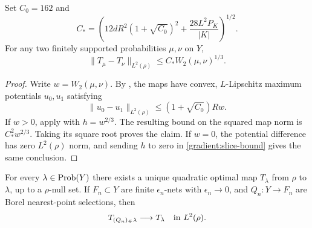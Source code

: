 \begin{corollary}\label{gradient:finite}
Set $C_0=162$ and
\begin{equation}\label{gradient:constant}
 C_*=
 \left(12dR^2(1+\sqrt{C_0})^2
             +\frac{28L^2P_K}{|K|}\right)^{1/2}.
\end{equation}
For any two finitely supported probabilities $\mu,\nu$ on $Y$,
\[
 \|T_\mu-T_\nu\|_{L^2(\rho)}
 \le C_*W_2(\mu,\nu)^{1/3}.
\]
\end{corollary}

\begin{proof}
Write $w=W_2(\mu,\nu)$.  By , the maps have
convex, $L$-Lipschitz maximum potentials $u_0,u_1$ satisfying
\[
 \|u_0-u_1\|_{L^2(\rho)}
 \le (1+\sqrt{C_0})Rw.
\]
If $w>0$, apply  with $h=w^{2/3}$.
The resulting bound on the squared map norm is $C_*^2w^{2/3}$.
Taking its square root proves the claim.  If $w=0$, the potential
difference has zero $L^2(\rho)$ norm, and sending $h$ to zero in
\eqref{gradient:slice-bound} gives the same conclusion.
\end{proof}

\begin{proposition}\label{gradient:extension}
For every $\lambda\in\operatorname{Prob}(Y)$ there exists a unique quadratic optimal
map $T_\lambda$ from $\rho$ to $\lambda$, up to a $\rho$-null set.
If $F_n\subset Y$ are finite $\epsilon_n$-nets with
$\epsilon_n\to0$, and $Q_n:Y\to F_n$ are Borel nearest-point
selections, then
\[
 T_{(Q_n)_\#\lambda}\longrightarrow T_\lambda
 \quad\hbox{in }L^2(\rho).
\]
\end{proposition}

